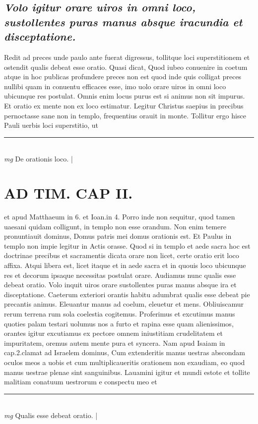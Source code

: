 \documentclass{article}
\begin{document}
\begin{pages}
\subsection*{\textit{Volo igitur orare uiros in omni loco, sustollentes puras manus absque iracundia et disceptatione. }}\pstart Redit ad preces unde paulo ante fuerat digressus, tollitque loci superstitionem et ostendit qualis debeat esse oratio. Quasi dicat, Quod iubeo conuenire in coetum atque in hoc publicas profundere preces non est quod inde quis colligat preces nullibi quam in conuentu efficaces esse, imo uolo orare uiros in omni loco ubicunque res postulat. Omnis enim locus purus est si animus non sit impurus. Et oratio ex mente non ex loco estimatur. Legitur Christus saepius in precibus pernoctasse sane non in templo, frequentius orauit in monte. Tollitur ergo hisce Pauli uerbis loci superstitio, ut  \pend
\vspace{0.5cm}\noindent
\vspace{0.2cm}\rule{1cm}{0.2pt}\\ 
\hspace{0.2cm}\textit{mg}
\footnotesize De orationis loco. 
\normalsize| 
\section*{AD TIM. CAP II. }
\marginpar{[ p.118 ]}\pstart et apud Matthaeum in 6. et Ioan.in 4. Porro inde non sequitur, quod tamen uaesani quidam colligunt, in templo non esse orandum. Non enim temere pronuntiauit dominus, Domus patris mei domus orationis est. Et Paulus in templo non impie legitur in Actis orasse. Quod si in templo et aede sacra hoc est doctrinae precibus et sacramentis dicata orare non licet, certe oratio erit loco affixa. Atqui libera est, licet itaque et in aede sacra et in quouis loco ubicunque res et decorum ipsaque necessitas postulat orare. Audiamus nunc qualis esse debeat oratio. Volo inquit uiros orare sustollentes puras manus absque ira et disceptatione. Caeterum exteriori orantis habitu adumbrat qualis esse debeat pie precantis animus. Eleuantur manus ad coelum, eleuetur et mens. Obliuiscamur rerum terrena rum sola coelestia cogitemus. Proferimus et excutimus manus quoties palam testari uolumus nos a furto et rapina esse quam alienissimos, orantes igitur excutiamus ex pectore omnem iniustitiam crudelitatem et impuritatem, oremus autem mente pura et syncera. Nam apud Isaiam in cap.2.clamat ad Israelem dominus, Cum extenderitis manus uestras abscondam oculos meos a uobis et cum multiplicaueritis orationem non exaudiam, eo quod manus uestrae plenae sint sanguinibus. Lauamini igitur et mundi estote et tollite malitiam conatuum uestrorum e conspectu meo et  \pend
\vspace{0.5cm}\noindent
\vspace{0.2cm}\rule{1cm}{0.2pt}\\ 
\hspace{0.2cm}\textit{mg}
\footnotesize Qualis esse debeat oratio. 
\normalsize| 

\end{pages}
\end{document}
